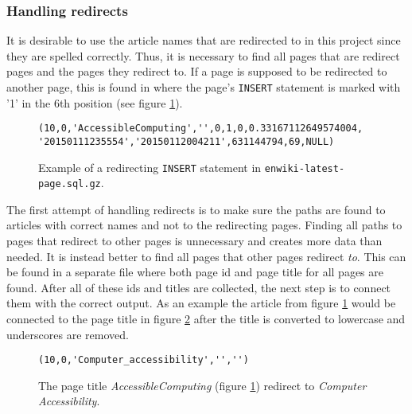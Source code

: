 \subsubsection{Handling redirects}
It is desirable to use the article names that are redirected to in this project since they are spelled correctly. Thus, it is necessary to find all pages that are redirect pages and the pages they redirect to. 
If a page is supposed to be redirected to another page, this is found in \enwikipage where the page's \texttt{INSERT} statement is marked with '1' in the 6th position (see figure \ref{fig:isredirect}).

\begin{figure}[h]
\centering
\begin{lstlisting}
(10,0,'AccessibleComputing','',0,1,0,0.33167112649574004,
'20150111235554','20150112004211',631144794,69,NULL)
\end{lstlisting}
\caption{Example of a redirecting \texttt{INSERT} statement in \texttt{enwiki-latest-page.sql.gz}.} 
\label{fig:isredirect}
\end{figure}
The first attempt of handling redirects is to make sure the paths are found to articles with correct names and not to the redirecting pages. Finding all paths to pages that redirect to other pages is unnecessary and creates more data than needed. It is instead better to find all pages that other pages redirect \emph{to}. This can be found in a separate file \enwikiredirect where both page id and page title for all pages are found. After all of these ids and titles are collected, the next step is to connect them with the correct output. As an example the article from figure \ref{fig:isredirect} would  be connected to the page title in figure \ref{fig:correctacccomp} after the title is converted to lowercase and underscores are removed. 

\begin{figure}[h]
\centering
\begin{lstlisting}
(10,0,'Computer_accessibility','','')
\end{lstlisting}
\caption[Example of a page redirecting to]{The page title \emph{AccessibleComputing} (figure \ref{fig:isredirect}) redirect to \emph{Computer Accessibility}.}
\label{fig:correctacccomp}
\end{figure}



%

